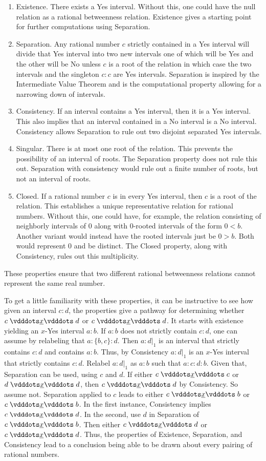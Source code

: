 \documentclass[12pt]{article}
\begin{document}
\begin{enumerate}
    \item Existence. There exists a Yes interval. Without this, one could have the null relation as a rational betweenness relation. Existence gives a starting point for further computations using Separation. 
    \item Separation. Any rational number $c$ strictly contained in a Yes interval will divide that Yes interval into two new intervals one of which will be Yes and the other will be No unless $c$ is a root of the relation in which case the two intervals and the singleton $c:c$ are Yes intervals. Separation is inspired by the Intermediate Value Theorem and is the computational property allowing for a narrowing down of intervals. 
    \item Consistency. If an interval contains a Yes interval, then it is a Yes interval. This also implies that an interval contained in a No interval is a No interval. Consistency allows Separation to rule out two disjoint separated Yes intervals. 
    \item Singular. There is at most one root of the relation. This prevents the possibility of an interval of roots. The Separation property does not rule this out. Separation with consistency would rule out a finite number of roots, but not an interval of roots.  
    \item Closed. If a rational number $c$ is in every Yes interval, then $c$ is a root of the relation. This establishes a unique representative relation for rational numbers. Without this, one could have, for example, the relation consisting of neighborly intervals of 0 along with 0-rooted intervals of the form $0 \lt b$. Another variant would instead have the rooted intervals just be $0 \gt b$. Both would represent 0 and be distinct. The Closed property, along with Consistency, rules out this multiplicity. 
\end{enumerate}

These properties ensure that two different rational betweenness relations cannot represent the same real number. 

To get a little familiarity with these properties, it can be instructive to see how given an interval $c:d$, the properties give a pathway for determining whether $c \xrel d$ or \sout{$c \xrel d$}. It starts with existence yielding an $x$-Yes interval $a:b$. If $a:b$ does not strictly contain $c:d$, one can assume by relabeling that $a:\{b, c\} :d$. Then $a:d|_1$ is an interval that strictly contains $c:d$ and contains $a:b$. Thus, by Consistency $a:d|_1$ is an $x$-Yes interval that strictly contains $c:d$. Relabel $a:d|_1$ as $a:b$ such that $a:c:d:b$. Given that, Separation can be used, using $c$ and $d$. If either $c \xrel c$ or $d \xrel d$, then $c \xrel d$ by Consistency. So assume not. Separation applied to $c$ leads to either \sout{$c \xrel b$} or $c \xrel b$. In the first instance, Consistency implies \sout{$c \xrel d$}. In the second, use $d$ in Separation of $c \xrel b$. Then either $c \xrel d$ or \sout{$c \xrel d$}. Thus, the properties of Existence, Separation, and Consistency lead to a conclusion being able to be drawn about every pairing of rational numbers. 
\end{document}
